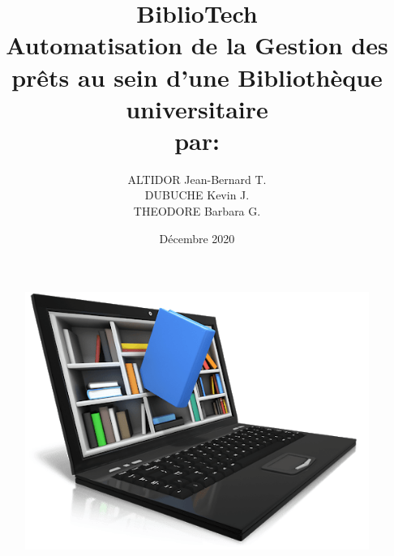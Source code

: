 \documentclass[a4paper,12pt]{report}
\begin{document}
\begin{figure}[!tbp]
    \centering
    \hfill
\end{figure}

\begin{figure}[h]
    \centering
    \includegraphics[width=1\textwidth]{lib}
    \label{image-lib}
\end{figure}


\title{BiblioTech \\ Automatisation de la Gestion des prêts au sein d'une Bibliothèque universitaire \\ par:}
\author{ALTIDOR Jean-Bernard T. \\ DUBUCHE Kevin J. \\ THEODORE Barbara G.}
\date{Décembre 2020}
\maketitle
\end{document}
